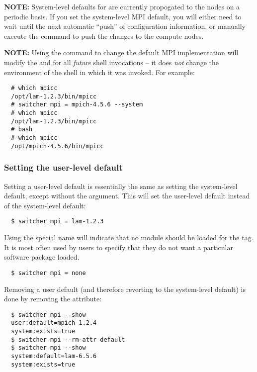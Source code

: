 {\bf NOTE:} System-level defaults for  are currently
propogated to the nodes on a periodic basis.  If you set the
system-level MPI default, you will either need to wait until the next
automatic ``push'' of configuration information, or manually execute
the  command to push the changes to
the compute nodes.

{\bf NOTE:} Using the  command to change the default MPI
implementation will modify the  and  for all
{\em future} shell invocations -- it does {\em not} change the
environment of the shell in which it was invoked.  For example:

\begin{verbatim}
  # which mpicc
  /opt/lam-1.2.3/bin/mpicc
  # switcher mpi = mpich-4.5.6 --system
  # which mpicc
  /opt/lam-1.2.3/bin/mpicc
  # bash
  # which mpicc
  /opt/mpich-4.5.6/bin/mpicc
\end{verbatim}


\subsubsection{Setting the user-level default}

Setting a user-level default is essentially the same as setting the
system-level default, except without the  argument.
This will set the user-level default instead of the system-level
default:

\begin{verbatim}
  $ switcher mpi = lam-1.2.3
\end{verbatim}

Using the special name  will indicate that no module should
be loaded for the  tag.  It is most often used by users to
specify that they do not want a particular software package loaded.

\begin{verbatim}
  $ switcher mpi = none
\end{verbatim}

Removing a user default (and therefore reverting to the system-level
default) is done by removing the  attribute:

\begin{verbatim}
  $ switcher mpi --show
  user:default=mpich-1.2.4
  system:exists=true
  $ switcher mpi --rm-attr default
  $ switcher mpi --show
  system:default=lam-6.5.6
  system:exists=true
\end{verbatim}
